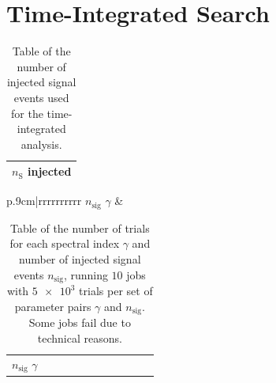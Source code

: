 %      

\section{Time-Integrated Search}

\begin{table}
  \centering
  \caption{Table of the number of injected signal events used for the time-integrated analysis.}
  \label{tab:sig_time_int_table}
  \begin{tabular}{r}
    \toprule
    $n_\text{S}$ injected \\
    \toprule
      
    \toprule
  \end{tabular}
\end{table}

\begin{table}
  \caption{Table of the number of trials for each spectral index $\gamma$ and number of injected signal events $n_\text{sig}$, running $\num{10}$ jobs with $\num{5e3}$ trials per set of parameter pairs $\gamma$ and $n_\text{sig}$. Some jobs fail due to technical reasons.}
  \label{tab:trials_sig_time_int_table}
  \begin{subtable}{\linewidth}
  \centering
  \begin{tabular}{p{.9cm}|rrrrrrrrrr}
    \toprule
    \: $n_\text{sig}$ \newline $\gamma$ \: & 
    \toprule
    
    \toprule
  \end{tabular}
\end{subtable}
\begin{subtable}{\linewidth}
\centering
  \begin{tabular}{p{.9cm}|rrrrrrrrrr}
    \toprule
    \: $n_\text{sig}$ \newline $\gamma$ \: & 
    \toprule
    
    \toprule
  \end{tabular}
  \end{subtable}
\end{table}

